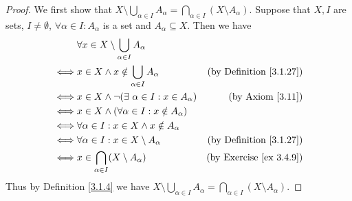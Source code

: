 \begin{proof}
    We first show that \(X \setminus \bigcup_{\alpha \in I} A_{\alpha} = \bigcap_{\alpha \in I} (X \setminus A_{\alpha})\).
    Suppose that \(X, I\) are sets, \(I \neq \emptyset\), \(\forall \alpha \in I : A_{\alpha}\) is a set and \(A_{\alpha} \subseteq X\).
    Then we have
    \begin{align*}
             & \forall x \in X \setminus \bigcup_{\alpha \in I} A_{\alpha}                                         \\
        \iff & x \in X \land x \notin \bigcup_{\alpha \in I} A_{\alpha}      & \text{(by Definition \ref{3.1.27})} \\
        \iff & x \in X \land \lnot(\exists\ \alpha \in I : x \in A_{\alpha}) & \text{(by Axiom \ref{3.11})}        \\
        \iff & x \in X \land (\forall \alpha \in I : x \notin A_{\alpha})                                          \\
        \iff & \forall \alpha \in I : x \in X \land x \notin A_{\alpha}                                            \\
        \iff & \forall \alpha \in I : x \in X \setminus A_{\alpha}           & \text{(by Definition \ref{3.1.27})} \\
        \iff & x \in \bigcap_{\alpha \in I} (X \setminus A_{\alpha})         & \text{(by Exercise \ref{ex 3.4.9})} \\
    \end{align*}
    Thus by Definition \ref{3.1.4} we have \(X \setminus \bigcup_{\alpha \in I} A_{\alpha} = \bigcap_{\alpha \in I} (X \setminus A_{\alpha})\).


\end{proof}
